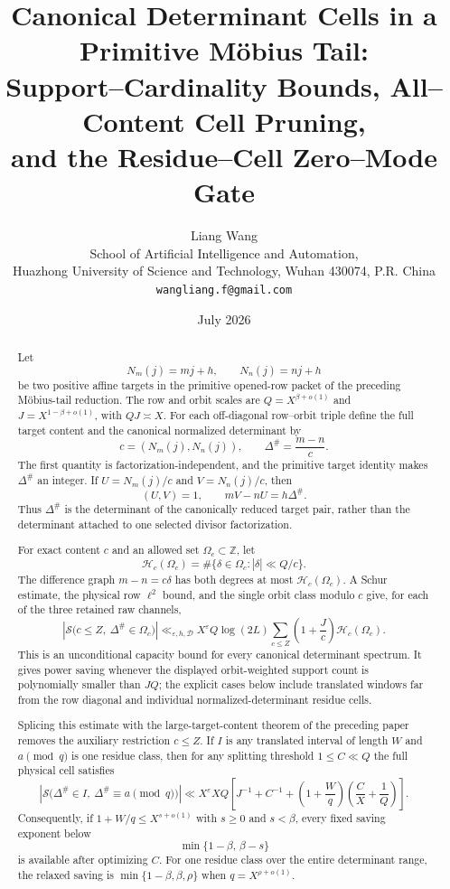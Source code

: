 \documentclass[11pt]{article}
\title{\textbf{Canonical Determinant Cells in a Primitive M\"obius Tail:}\\
\textbf{Support--Cardinality Bounds, All--Content Cell Pruning,}\\
\textbf{and the Residue--Cell Zero--Mode Gate}}
\author{Liang Wang\\
\small School of Artificial Intelligence and Automation,\\[-0.2em]
\small Huazhong University of Science and Technology, Wuhan 430074, P.R. China\\
\small \texttt{wangliang.f@gmail.com}}
\date{July 2026}
\theoremstyle{definition}
\theoremstyle{remark}
\newcommand{\Z}{\mathbb Z}
\newcommand{\eps}{\varepsilon}
\newcommand{\cH}{\mathcal H}
\newcommand{\cS}{\mathcal S}
\begin{document}
\maketitle

\begin{abstract}
Let
\[
 N_m(j)=mj+h,\qquad N_n(j)=nj+h
\]
be two positive affine targets in the primitive opened-row packet of
the preceding M\"obius-tail reduction.  The row and orbit scales are
$Q=X^{\beta+o(1)}$ and $J=X^{1-\beta+o(1)}$, with $QJ\asymp X$.
For each off-diagonal row--orbit triple define the full target content
and the canonical normalized determinant by
\[
 c=(N_m(j),N_n(j)),\qquad
 \Delta^\#=\frac{m-n}{c}.
\]
The first quantity is factorization-independent, and the primitive
target identity makes $\Delta^\#$ an integer.  If
$U=N_m(j)/c$ and $V=N_n(j)/c$, then
\[
 (U,V)=1,\qquad mV-nU=h\Delta^\#.
\]
Thus $\Delta^\#$ is the determinant of the canonically reduced target
pair, rather than the determinant attached to one selected divisor
factorization.

For exact content $c$ and an allowed set $\Omega_c\subset\Z$, let
\[
 \cH_c(\Omega_c)
 =\#\{\delta\in\Omega_c:|\delta|\ll Q/c\}.
\]
The difference graph $m-n=c\delta$ has both degrees at most
$\cH_c(\Omega_c)$.  A Schur estimate, the physical row $\ell^2$
bound, and the single orbit class modulo $c$ give, for each of the
three retained raw channels,
\[
 \left|\cS\bigl(c\le Z,\ \Delta^\#\in\Omega_c\bigr)\right|
 \ll_{\eps,h,\mathscr D}
 X^\eps Q\log(2L)
 \sum_{c\le Z}\left(1+\frac Jc\right)
 \cH_c(\Omega_c).
\]
This is an unconditional capacity bound for every canonical
determinant spectrum.  It gives power saving whenever the displayed
orbit-weighted support count is polynomially smaller than $JQ$; the
explicit cases below include translated windows far from the row
diagonal and individual normalized-determinant residue cells.

Splicing this estimate with the large-target-content theorem of the
preceding paper removes the auxiliary restriction $c\le Z$.  If
$I$ is any translated interval of length $W$ and $a\pmod q$ is one
residue class, then for any splitting threshold $1\le C\ll Q$ the
full physical cell satisfies
\[
 \left|\cS\bigl(\Delta^\#\in I,
 \ \Delta^\#\equiv a\!\pmod q\bigr)\right|
 \ll X^\eps XQ\left[
 J^{-1}+C^{-1}
 +\left(1+\frac Wq\right)
 \left(\frac CX+\frac1Q\right)
 \right].
\]
Consequently, if $1+W/q\le X^{s+o(1)}$ with $s\ge0$ and $s<\beta$,
every fixed saving exponent below
\[
 \min\{1-\beta,\,\beta-s\}
\]
is available after optimizing $C$.  For one residue class over the
entire determinant range, the relaxed saving is
$\min\{1-\beta,\beta,\rho\}$ when $q=X^{\rho+o(1)}$.


\end{abstract}
\end{document}
